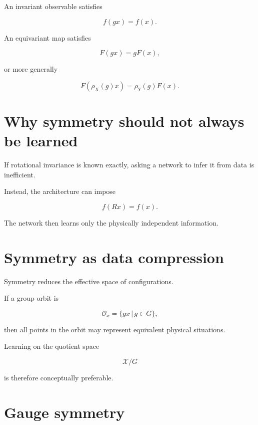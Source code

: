 \documentclass[11pt,a4paper,oneside]{book}
\begin{document}
An invariant observable satisfies

\begin{equation}
f(gx)=f(x).
\end{equation}

An equivariant map satisfies

\begin{equation}
F(gx)=gF(x),
\end{equation}

or more generally

\begin{equation}
F(\rho_X(g)x)
=
\rho_Y(g)F(x).
\end{equation}

\section{Why symmetry should not always be learned}

If rotational invariance is known exactly, asking a network to infer it from
data is inefficient.

Instead, the architecture can impose

\begin{equation}
f(Rx)=f(x).
\end{equation}

The network then learns only the physically independent information.

\section{Symmetry as data compression}

Symmetry reduces the effective space of configurations.

If a group orbit is

\begin{equation}
\mathcal{O}_x
=
\{gx\,|\,g\in G\},
\end{equation}

then all points in the orbit may represent equivalent physical situations.

Learning on the quotient space

\begin{equation}
\mathcal{X}/G
\end{equation}

is therefore conceptually preferable.

\section{Gauge symmetry}
\end{document}

